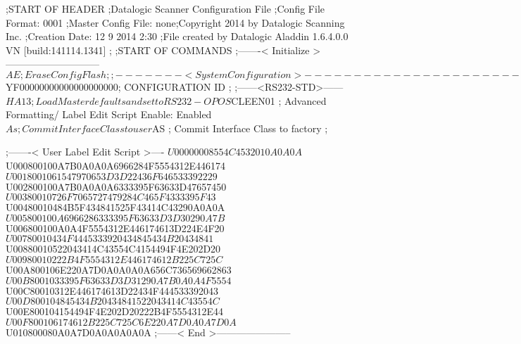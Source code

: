 ;START OF HEADER
;Datalogic Scanner Configuration File
;Config File Format: 0001
;Master Config File: none;Copyright 2014 by Datalogic Scanning Inc.
;Creation Date: 12 9 2014 2:30
;File created by Datalogic Aladdin 1.6.4.0.0 VN [build:141114.1341]
;
;START OF COMMANDS
;-------< Initialize >-----------------------------
$AE                 ; Erase Config Flash
;
;-------< System Configuration >-------------------------------
$YF00000000000000000000; CONFIGURATION ID
;
;------<RS232-STD>------
$HA13               ; Load Master defaults and set to RS232-OPOS
$CLEEN01            ; Advanced Formatting/ Label Edit Script Enable: Enabled
$As                 ; Commit Interface Class to user
$AS                 ; Commit Interface Class to factory
;

;-------< User Label Edit Script >----
$U00000008554C4532010A0A0A
$U000800100A7B0A0A0A6966284F5554312E446174
$U0018001061547970653D3D22436F646533392229
$U002800100A7B0A0A0A6333395F63633D47657450
$U00380010726F7065727479284C465F4333395F43
$U00480010484B5F434841525F43414C43290A0A0A
$U005800100A6966286333395F63633D3D30290A7B
$U006800100A0A4F5554312E446174613D224E4F20
$U00780010434F4445333920434845434B20434841
$U00880010522043414C43554C4154494F4E202D20
$U00980010222B4F5554312E446174612B225C725C
$U00A800106E220A7D0A0A0A0A656C736569662863
$U00B8001033395F63633D3D31290A7B0A0A4F5554
$U00C80010312E446174613D22434F444533392043
$U00D800104845434B20434841522043414C43554C
$U00E800104154494F4E202D20222B4F5554312E44
$U00F800106174612B225C725C6E220A7D0A0A7D0A
$U010800080A0A7D0A0A0A0A0A
;------< End >-----------------------
